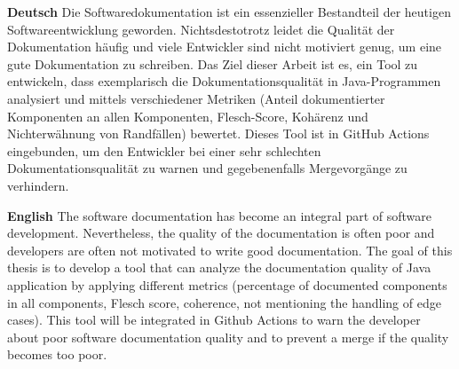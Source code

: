 \textbf{Deutsch}
Die Softwaredokumentation ist ein essenzieller Bestandteil der heutigen Softwareentwicklung geworden. Nichtsdestotrotz leidet die Qualität der Dokumentation häufig und viele Entwickler sind nicht motiviert genug, um eine gute Dokumentation zu schreiben. Das Ziel dieser Arbeit ist es, ein Tool zu entwickeln, dass exemplarisch die Dokumentationsqualität in Java-Programmen analysiert und mittels verschiedener Metriken (Anteil dokumentierter Komponenten an allen Komponenten, Flesch-Score, Kohärenz und Nichterwähnung von Randfällen) bewertet. Dieses Tool ist in GitHub Actions eingebunden, um den Entwickler bei einer sehr schlechten Dokumentationsqualität zu warnen und gegebenenfalls Mergevorgänge zu verhindern.

\bigskip

\noindent
\textbf{English} 
The software documentation has become an integral part of software development. Nevertheless, the quality of the documentation is often poor and developers are often not motivated to write good documentation. The goal of this thesis is to develop a tool that can analyze the documentation quality of Java application by applying different metrics (percentage of documented components in all components, Flesch score, coherence, not mentioning the handling of edge cases). This tool will be integrated in Github Actions to warn the developer about poor software documentation quality and to prevent a merge if the quality becomes too poor.  

